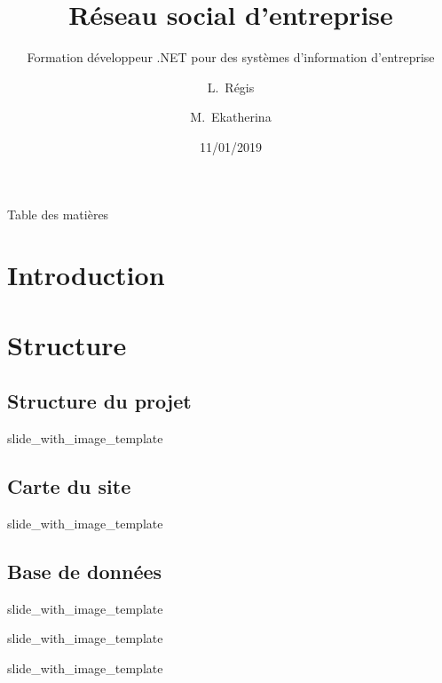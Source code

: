 \documentclass{beamer}
\title[Présentation de Projet RSE] %
{Réseau social d'entreprise}
\subtitle
{ Formation développeur .NET pour des systèmes d'information d'entreprise} %
\author[Régis, Ekatherina] %
{L.~Régis \and M.~Ekatherina}
\date[Short Occasion] %
{11/01/2019}
\begin{document}
\begin{frame}
  \titlepage
\end{frame}

\begin{frame}{Table des matières}
  \tableofcontents
\end{frame}




\section{Introduction}

\section{Structure}

\subsection{Structure du projet}
\def\titlename{Structure du projet}
\def\imagepath{images/dataflow.png}
 {slide_with_image_template}

\subsection{Carte du site}
\def\titlename{Carte du site}
\def\imagepath{images/sitemap.png}
 {slide_with_image_template}

\subsection{Base de données}

\def\titlename{Employee}
\def\imagepath{images/database/Employee.png}
 {slide_with_image_template}

\def\titlename{Department}
\def\imagepath{images/database/department.png}
 {slide_with_image_template}

\def\titlename{Project}
\def\imagepath{images/database/Project.png}
 {slide_with_image_template}
\end{document}
